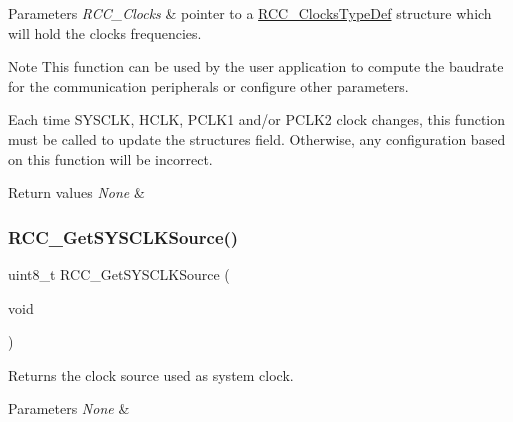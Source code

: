 \begin{DoxyParams}{Parameters}
{\em R\+C\+C\+\_\+\+Clocks} & pointer to a \mbox{\hyperlink{struct_r_c_c___clocks_type_def}{R\+C\+C\+\_\+\+Clocks\+Type\+Def}} structure which will hold the clocks frequencies.\\
\hline
\end{DoxyParams}
\begin{DoxyNote}{Note}
This function can be used by the user application to compute the baudrate for the communication peripherals or configure other parameters. 

Each time S\+Y\+S\+C\+LK, H\+C\+LK, P\+C\+L\+K1 and/or P\+C\+L\+K2 clock changes, this function must be called to update the structure\textquotesingle{}s field. Otherwise, any configuration based on this function will be incorrect.
\end{DoxyNote}

\begin{DoxyRetVals}{Return values}
{\em None} & \\
\hline
\end{DoxyRetVals}
\mbox{\label{group___r_c_c___group2_gaaeb32311c208b2a980841c9c884a41ea}} 
\subsubsection{\texorpdfstring{R\+C\+C\+\_\+\+Get\+S\+Y\+S\+C\+L\+K\+Source()}{RCC\_GetSYSCLKSource()}}
{\footnotesize\ttfamily uint8\+\_\+t R\+C\+C\+\_\+\+Get\+S\+Y\+S\+C\+L\+K\+Source (\begin{DoxyParamCaption}\item[{void}]{ }\end{DoxyParamCaption})}



Returns the clock source used as system clock. 


\begin{DoxyParams}{Parameters}
{\em None} & \\
\hline
\end{DoxyParams}

